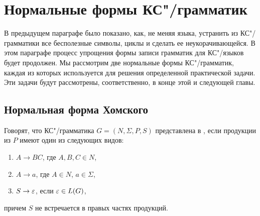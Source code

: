 \chapter{Нормальные формы КС"/грамматик}
\label{normal-cfg}

В предыдущем параграфе было показано, как, не меняя языка, устранить из
КС"/грамматики все бесполезные символы, циклы и сделать ее неукорачивающейся.
В этом параграфе процесс упрощения формы записи грамматик для КС"/языков
будет продолжен. Мы рассмотрим две нормальные формы КС"/грамматик,
каждая из которых используется для решения определенной
практической задачи. Эти задачи будут рассмотрены, соответственно,
в конце этой и следующей главы.


\section{Нормальная форма Хомского}
\label{Chapter7NFH}

Говорят, что КС"/грамматика $G=(N,\Sigma,P,S)$ представлена в
, если продукции из $P$
имеют один из следующих видов:
\begin{enumerate}
    \item $A\to BC$, где $A,B,C\in N$,

    \item $A\to a$, где $A\in N$, $a\in\Sigma$,

    \item $S\to\varepsilon$, если $\varepsilon\in L(G)$,
\end{enumerate}
причем $S$ не встречается в правых частях продукций.

